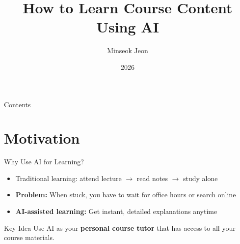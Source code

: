 \documentclass[aspectratio=169,xcolor=dvipsnames]{beamer}
\title[AI-Assisted Learning]{How to Learn Course Content Using AI}
\author[M. Jeon]{Minseok Jeon}
\institute[DGIST]{PLX Lab\\DGIST}
\date{2026}
\begin{document}
\begin{frame}[plain]
  \titlepage
\end{frame}

\begin{frame}[plain]{Contents}
  \tableofcontents
\end{frame}

\section{Motivation}

\begin{frame}{Why Use AI for Learning?}
  \begin{itemize}
    \item Traditional learning: attend lecture $\rightarrow$ read notes $\rightarrow$ study alone
    \item \textbf{Problem:} When stuck, you have to wait for office hours or search online
    \item \textbf{AI-assisted learning:} Get instant, detailed explanations anytime
  \end{itemize}

  \vspace{1em}
  \begin{block}{Key Idea}
    Use AI as your \textbf{personal course tutor} that has access to all your course materials.
  \end{block}
\end{frame}
\end{document}
